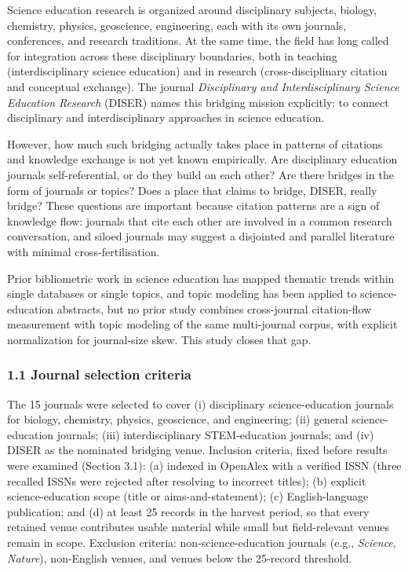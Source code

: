\documentclass[pdflatex,sn-apa]{sn-jnl}
\begin{document}
Science education research is organized around disciplinary subjects,
biology, chemistry, physics, geoscience, engineering, each with its own
journals, conferences, and research traditions. At the same time, the
field has long called for integration across these disciplinary
boundaries, both in teaching (interdisciplinary science education) and
in research (cross-disciplinary citation and conceptual exchange). The
journal \emph{Disciplinary and Interdisciplinary Science Education
Research} (DISER) names this bridging mission explicitly: to connect
disciplinary and interdisciplinary approaches in science education.

However, how much such bridging actually takes place in patterns of
citations and knowledge exchange is not yet known empirically. Are
disciplinary education journals self-referential, or do they build on
each other? Are there bridges in the form of journals or topics? Does a
place that claims to bridge, DISER, really bridge? These questions are
important because citation patterns are a sign of knowledge flow:
journals that cite each other are involved in a common research
conversation, and siloed journals may suggest a disjointed and parallel
literature with minimal cross-fertilisation.

Prior bibliometric work in science education has mapped thematic trends
within single databases or single topics, and topic modeling has been
applied to science-education abstracts, but no prior study combines
cross-journal citation-flow measurement with topic modeling of the same
multi-journal corpus, with explicit normalization for journal-size skew.
This study closes that gap.

\subsubsection{1.1 Journal selection
criteria}\label{journal-selection-criteria}

The 15 journals were selected to cover (i) disciplinary
science-education journals for biology, chemistry, physics, geoscience,
and engineering; (ii) general science-education journals; (iii)
interdisciplinary STEM-education journals; and (iv) DISER as the
nominated bridging venue. Inclusion criteria, fixed before results were
examined (Section 3.1): (a) indexed in OpenAlex with a verified ISSN
(three recalled ISSNs were rejected after resolving to incorrect
titles); (b) explicit science-education scope (title or
aims-and-statement); (c) English-language publication; and (d) at least
25 records in the harvest period, so that every retained venue
contributes usable material while small but field-relevant venues remain
in scope. Exclusion criteria: non-science-education journals (e.g.,
\emph{Science}, \emph{Nature}), non-English venues, and venues below the
25-record threshold.
\end{document}

